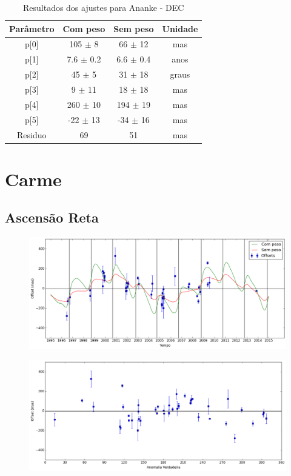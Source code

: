 \documentclass[11pt,a4paper]{report}
\begin{document}
\begin{table}[h!]
\caption{\label{Tab: Ananke-DEC} Resultados dos ajustes para Ananke - DEC}
\begin{centering}
\begin{tabular}{cccc}
\hline
\hline
Parâmetro & Com peso & Sem peso & Unidade\tabularnewline
\hline
p[0] & 105 $\pm$ 8 & 66 $\pm$ 12 & mas\\
p[1] & 7.6 $\pm$ 0.2 & 6.6 $\pm$ 0.4 & anos\\
p[2] & 45 $\pm$ 5 & 31 $\pm$ 18 & graus\\
p[3] & 9 $\pm$ 11 & 18 $\pm$ 18 & mas\\
p[4] & 260 $\pm$ 10 & 194 $\pm$ 19 & mas\\
p[5] & -22 $\pm$ 13 & -34 $\pm$ 16 & mas\\
Residuo & 69 & 51 & mas\\
\hline 
\end{tabular} 
\par\end{centering}
\end{table}

\chapter*{Carme}
\section*{Ascensão Reta}

\begin{figure}[h]
\includegraphics[scale=0.45]{Carme/RA.png} 
\end{figure}

\begin{figure}[h]
\includegraphics[scale=0.45]{Carme/RA_anom.png}  
\end{figure}
\end{document}
